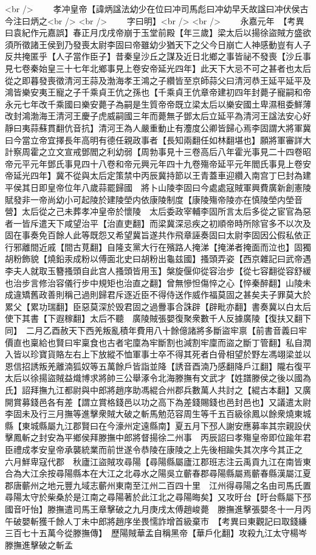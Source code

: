 <br />
　　孝冲皇帝【諱炳諡法幼少在位曰冲司馬彪曰冲幼早夭故諡曰冲伏侯古今注曰炳之<br />
<br />
　　字曰明】<br />
<br />
　　永嘉元年　【考異曰袁紀作元嘉誤】春正月戊戌帝崩于玉堂前殿【年三歲】梁太后以揚徐盜賊方盛欲須所徵諸王侯到乃發喪太尉李固曰帝雖幼少猶天下之父今日崩亡人神感動豈有人子反共掩匿乎【人子當作臣子】昔秦皇沙丘之謀及近日北鄉之事皆祕不發喪【沙丘事見七卷秦始皇三十七年北鄉事見上卷安帝延光四年】此天下大忌不可之甚者也太后從之即暮發喪徵清河王蒜及渤海孝王鴻之子纘皆至京師蒜父曰清河恭王延平延平及鴻皆樂安夷王寵之子千乘貞王伉之孫也【千乘貞王伉章帝建初四年封薨子寵嗣和帝永元七年改千乘國曰樂安薨子為嗣是生質帝帝既立梁太后以樂安國土卑濕租委鮮薄改封鴻渤海王清河王慶子虎威嗣國三年而薨無子鄧太后立延平為清河王諡法安心好靜曰夷蒜蘇貫翻伉音抗】清河王為人嚴重動止有灋度公卿皆歸心焉李固謂大將軍冀曰今當立帝宜擇長年高明有德任親政事者【長知兩翻任如林翻堪也】願將軍審詳大計察周霍之立文宣戒鄧閻之利幼弱【周勃事見十三卷高后八年霍光事見二十四卷昭帝元平元年鄧氏事見四十八卷和帝元興元年四十九卷殤帝延平元年閻氏事見上卷安帝延光四年】冀不從與太后定策禁中丙辰冀持節以王青蓋車迎纘入南宫丁巳封為建平侯其日即皇帝位年八歲蒜罷歸國　將卜山陵李固曰今處處寇賊軍興費廣新創憲陵賦發非一帝尚幼小可起陵於建陵塋内依康陵制度【康陵殤帝陵亦在慎陵塋内塋音營】太后從之己未葬孝冲皇帝於懷陵　太后委政宰輔李固所言太后多從之宦官為惡者一皆斥遣天下咸望治平【治直吏翻】而梁冀深忌疾之初順帝時所除官多不以次及固在事奏免百餘人此等既怨又希望冀旨遂共作飛章誣奏固曰太尉李固因公假私依正行邪離間近戚【間古莧翻】自隆支黨大行在殯路人掩涕【掩涕者掩面而泣也】固獨胡粉飾貌【燒鉛汞成粉以傅面北史曰胡粉出龜兹國】搔頭弄姿【西京雜記曰武帝遇李夫人就取玉簪搔頭自此宫人搔頭皆用玉】槃旋偃仰從容治步【從七容翻從容舒緩也治步言修治容儀行步中規矩也治直之翻】曾無慘怛傷悴之心【悴秦醉翻】山陵未成違矯舊政善則稱己過則歸君斥逐近臣不得侍送作威作福莫固之甚矣夫子罪莫大於累父【累功瑞翻】臣惡莫深於毁君固之過釁事合誅辟【辟毗亦翻】書奏冀以白太后使下其書【下遐稼翻】太后不聽　廣陵賊張嬰復聚衆數千人反據廣陵【復扶又翻下同】　二月乙酉赦天下西羌叛亂積年費用八十餘億諸將多斷盜牢禀【前書音義曰牢價直也稟給也賢曰牢稟食也古者宅廩為牢斷割也減割牢廩而盜之斷丁管翻】私自潤入皆以珍寶貨賂左右上下放縱不恤軍事士卒不得其死者白骨相望於野左馮翊梁並以恩信招誘叛羌離湳狐奴等五萬餘戶皆詣並降【誘音酉湳乃感翻降戶江翻】隴右復平　太后以徐揚盜賊益熾博求將帥三公舉涿令北海滕撫有文武才【姓譜滕侯之後以國為氏】詔拜撫九江都尉與中郎將趙序助馮緄合州郡兵數萬人共討之【緄古本翻】又廣開賞募錢邑各有差【謂立賞格錢邑以功之高下為差錢賜錢也邑封邑也】又議遣太尉李固未及行三月撫等進擊衆賊大破之斬馬勉范容周生等千五百級徐鳳以餘衆燒東城縣【東城縣屬九江郡賢曰在今濠州定遠縣南】夏五月下邳人謝安應募率其宗親設伏擊鳳斬之封安為平鄉侯拜滕撫中郎將督揚徐二州事　丙辰詔曰孝殤皇帝即位踰年君臣禮成孝安皇帝承襲統業而前世遂令恭陵在康陵之上先後相踰失其次序今其正之　六月鮮卑寇代郡　秋廬江盜賊攻尋陽【尋陽縣屬廬江郡班志注云禹貢九江在南皆東合為大江余按尋陽縣本在大江之北尋水之陽吳立蘄春郡尋陽縣屬焉蘄春縣漢屬江夏郡唐蘄州之地元豐九域志蘄州東南至江州二百四十里　江州得尋陽之名由司馬氏置尋陽太守於柴桑於是江南之尋陽著於此江北之尋陽晦矣】又攻旴台【旴台縣屬下邳國音吁怡】滕撫遣司馬王章擊破之九月庚戌太傅趙峻薨　滕撫進擊張嬰冬十一月丙午破嬰斬獲千餘人丁未中郎將趙序坐畏懦詐增首級棄市　【考異曰東觀記曰取錢縑三百七十五萬今從滕撫傳】　歷陽賊華孟自稱黑帝【華戶化翻】攻殺九江太守楊岑滕撫進擊破之斬孟